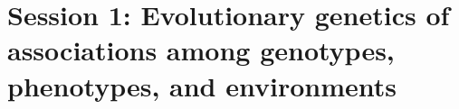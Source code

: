 \section[Session 1]{Session 1: Evolutionary genetics of associations among
genotypes, phenotypes, and environments}

\begin{frame}

\end{frame}